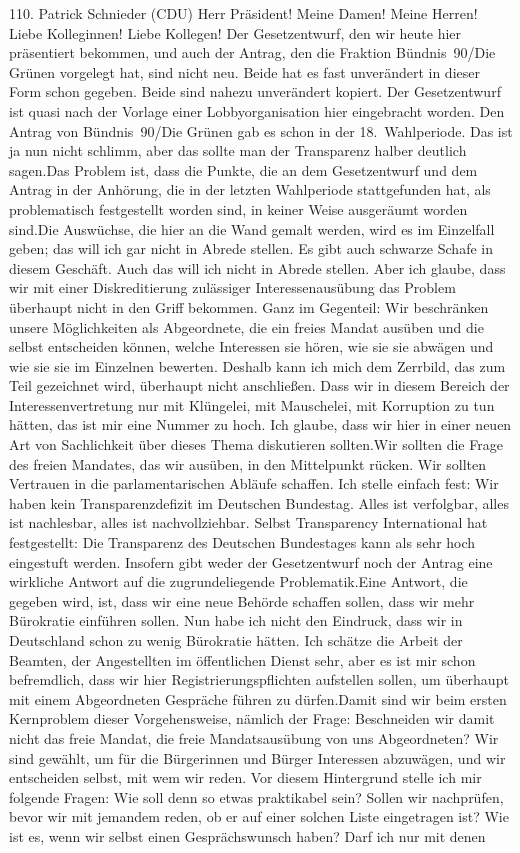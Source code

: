 \documentclass{article}
\begin{document}
	110. Patrick Schnieder (CDU) Herr Präsident! Meine Damen! Meine Herren! Liebe Kolleginnen! Liebe Kollegen! Der Gesetzentwurf, den wir heute hier präsentiert bekommen, und auch der Antrag, den die Fraktion Bündnis 90/Die Grünen vorgelegt hat, sind nicht neu. Beide hat es fast unverändert in dieser Form schon gegeben. Beide sind nahezu unverändert kopiert. Der Gesetzentwurf ist quasi nach der Vorlage einer Lobbyorganisation hier eingebracht worden. Den Antrag von Bündnis 90/Die Grünen gab es schon in der 18. Wahlperiode. Das ist ja nun nicht schlimm, aber das sollte man der Transparenz halber deutlich sagen.Das Problem ist, dass die Punkte, die an dem Gesetzentwurf und dem Antrag in der Anhörung, die in der letzten Wahlperiode stattgefunden hat, als problematisch festgestellt worden sind, in keiner Weise ausgeräumt worden sind.Die Auswüchse, die hier an die Wand gemalt werden, wird es im Einzelfall geben; das will ich gar nicht in Abrede stellen. Es gibt auch schwarze Schafe in diesem Geschäft. Auch das will ich nicht in Abrede stellen. Aber ich glaube, dass wir mit einer Diskreditierung zulässiger Interessenausübung das Problem überhaupt nicht in den Griff bekommen. Ganz im Gegenteil: Wir beschränken unsere Möglichkeiten als Abgeordnete, die ein freies Mandat ausüben und die selbst entscheiden können, welche Interessen sie hören, wie sie sie abwägen und wie sie sie im Einzelnen bewerten. Deshalb kann ich mich dem Zerrbild, das zum Teil gezeichnet wird, überhaupt nicht anschließen. Dass wir in diesem Bereich der Interessenvertretung nur mit Klüngelei, mit Mauschelei, mit Korruption zu tun hätten, das ist mir eine Nummer zu hoch. Ich glaube, dass wir hier in einer neuen Art von Sachlichkeit über dieses Thema diskutieren sollten.Wir sollten die Frage des freien Mandates, das wir ausüben, in den Mittelpunkt rücken. Wir sollten Vertrauen in die parlamentarischen Abläufe schaffen. Ich stelle einfach fest: Wir haben kein Transparenzdefizit im Deutschen Bundestag. Alles ist verfolgbar, alles ist nachlesbar, alles ist nachvollziehbar. Selbst Transparency International hat festgestellt: Die Transparenz des Deutschen Bundestages kann als sehr hoch eingestuft werden. Insofern gibt weder der Gesetzentwurf noch der Antrag eine wirkliche Antwort auf die zugrundeliegende Problematik.Eine Antwort, die gegeben wird, ist, dass wir eine neue Behörde schaffen sollen, dass wir mehr Bürokratie einführen sollen. Nun habe ich nicht den Eindruck, dass wir in Deutschland schon zu wenig Bürokratie hätten. Ich schätze die Arbeit der Beamten, der Angestellten im öffentlichen Dienst sehr, aber es ist mir schon befremdlich, dass wir hier Registrierungspflichten aufstellen sollen, um überhaupt mit einem Abgeordneten Gespräche führen zu dürfen.Damit sind wir beim ersten Kernproblem dieser Vorgehensweise, nämlich der Frage: Beschneiden wir damit nicht das freie Mandat, die freie Mandatsausübung von uns Abgeordneten? Wir sind gewählt, um für die Bürgerinnen und Bürger Interessen abzuwägen, und wir entscheiden selbst, mit wem wir reden. Vor diesem Hintergrund stelle ich mir folgende Fragen: Wie soll denn so etwas praktikabel sein? Sollen wir nachprüfen, bevor wir mit jemandem reden, ob er auf einer solchen Liste eingetragen ist? Wie ist es, wenn wir selbst einen Gesprächswunsch haben? Darf ich nur mit denen 
\end{document}
